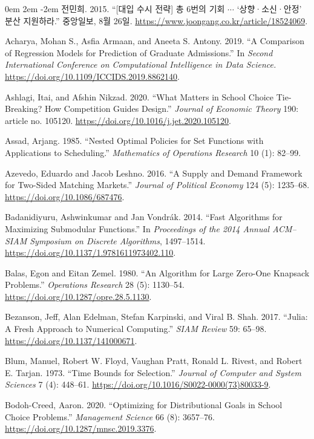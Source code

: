 \documentclass[11pt]{article} %
\theoremstyle{definition}
\theoremstyle{definition}
\begin{document}
\parskip 0em
\leftskip 2em
\parindent -2em
\ifen \else
전민희. 2015. ``{[대입 수시 전략]} 총 6번의 기회 $\cdots$ `상향·소신·안정' 분산 지원하라.'' 중앙일보, 8월 26일. \url{https://www.joongang.co.kr/article/18524069}.\fi

Acharya, Mohan S., Asfia Armaan, and Aneeta S. Antony. 2019. ``A Comparison of Regression Models for Prediction of Graduate Admissions.'' In \emph{Second International Conference on Computational Intelligence in Data Science.} \url{https://doi.org/10.1109/ICCIDS.2019.8862140}.

Ashlagi, Itai, and Afshin Nikzad. 2020. ``What Matters in School Choice Tie-Breaking? How Competition Guides Design.'' \emph{Journal of Economic Theory} 190: article no. 105120. \url{https://doi.org/10.1016/j.jet.2020.105120}.

Assad, Arjang. 1985. ``Nested Optimal Policies for Set Functions with Applications to Scheduling.'' \emph{Mathematics of Operations Research} 10 (1): 82--99.

Azevedo, Eduardo and Jacob Leshno. 2016. ``A Supply and Demand Framework for Two-Sided Matching Markets.'' \emph{Journal of Political Economy} 124 (5): 1235--68. \url{https://doi.org/10.1086/687476}. 

Badanidiyuru, Ashwinkumar and Jan Vondrák. 2014. ``Fast Algorithms for Maximizing Submodular Functions.'' In \emph{Proceedings of the 2014 Annual ACM--SIAM Symposium on Discrete Algorithms}, 1497--1514. \url{https://doi.org/10.1137/1.9781611973402.110}.

Balas, Egon and Eitan Zemel. 1980. ``An Algorithm for Large Zero-One Knapsack Problems.'' \emph{Operations Research} 28 (5): 1130--54. \url{https://doi.org/10.1287/opre.28.5.1130}. 

Bezanson, Jeff, Alan Edelman, Stefan Karpinski, and Viral B. Shah. 2017. ``Julia: A Fresh Approach to Numerical Computing.'' \emph{SIAM Review} 59: 65–98. \url{https://doi.org/10.1137/141000671}.

Blum,  Manuel, Robert W. Floyd, Vaughan Pratt, Ronald L. Rivest, and Robert E. Tarjan. 1973. ``Time Bounds for Selection.'' \emph{Journal of Computer and System Sciences} 7 (4): 448--61. \url{https://doi.org/10.1016/S0022-0000(73)80033-9}.

Bodoh-Creed, Aaron. 2020. ``Optimizing for Distributional Goals in School Choice Problems.'' \emph{Management Science} 66 (8): 3657--76. \url{https://doi.org/10.1287/mnsc.2019.3376}.

\end{document}

